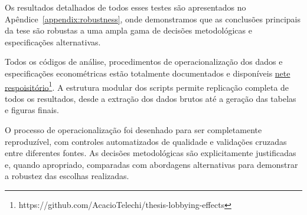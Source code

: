 Os resultados detalhados de todos esses testes são apresentados no Apêndice~\ref{appendix:robustness}, onde demonstramos que as conclusões principais da tese são robustas a uma ampla gama de decisões metodológicas e especificações alternativas.

Todos os códigos de análise, procedimentos de operacionalização dos dados e especificações econométricas estão totalmente documentados e disponíveis \href{https://github.com/AcacioTelechi/thesis-lobbying-effects}{nete respoisitório}\footnote{https://github.com/AcacioTelechi/thesis-lobbying-effects}. A estrutura modular dos scripts permite replicação completa de todos os resultados, desde a extração dos dados brutos até a geração das tabelas e figuras finais.

O processo de operacionalização foi desenhado para ser completamente reproduzível, com controles automatizados de qualidade e validações cruzadas entre diferentes fontes. As decisões metodológicas são explicitamente justificadas e, quando apropriado, comparadas com abordagens alternativas para demonstrar a robustez das escolhas realizadas.
